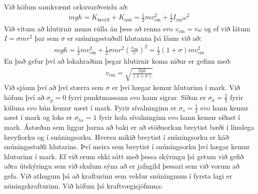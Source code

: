 Við höfum samkvæmt orkuvarðveislu að:
\begin{align*}
    mgh = K_{\text{hreyfi}} + K_{\text{snú}} = \frac{1}{2}mv_{\text{cm}}^2 + \frac{1}{2} I_{\text{cm}}\omega^2
\end{align*}
Við vitum að hlutirnir munu rúlla án þess að renna svo $v_{\text{cm}} = r\omega$ og ef við látum $I = \sigma mr^2$ þar sem $\sigma$ er snúningsstuðull hlutanna þá fáum við að:
\begin{align*}
    mgh = \frac{1}{2}mv_{\text{cm}}^2 + \frac{1}{2}\sigma mr^2 \left(\frac{v_{\text{cm}}}{r}\right)^2 = \frac{1}{2}\left(1+\sigma \right)mv_{\text{cm}}^2 
\end{align*}
En það gefur því að lokahraðinn þegar hlutirnir koma niður er gefinn með:
\begin{align*}
    v_{\text{cm}} = \sqrt{\frac{2gh}{(1+\sigma)}}
\end{align*}
Við sjáum því að því stærra sem $\sigma$ er því hægar kemur hluturinn í mark. Við höfum því að $\sigma_p = 0$ fyrri punktmassann svo hann sigrar. Síðan er $\sigma_k = \frac{2}{5}$ fyrir kúluna svo hún kemur næst í mark. Fyrir sívalninginn er $\sigma_s = \frac{1}{2}$ svo hann kemur næst í mark og loks er $\sigma_{hs} = 1$ fyrir hola sívalninginn svo hann kemur síðast í mark. Ástæðan sem liggur þarna að baki er að stöðuorkan breytist bæði í línulega hreyfiorku og í snúningsorku. Hversu mikið breytist í snúningsorku er háð snúningsstuðli hlutarins. Því meira sem breytist í snúningsorku því hægar kemur hluturinn í mark. Ef við erum ekki sátt með þessa skýringu þá getum við gefið aðra útskýringu sem við skulum sýna að er jafngild þessari sem við vorum að gefa. Við athugum þá að krafturinn sem veldur snúningnum í fyrsta lagi er núningskrafturinn. Við höfum þá kraftvægisjöfnuna:

